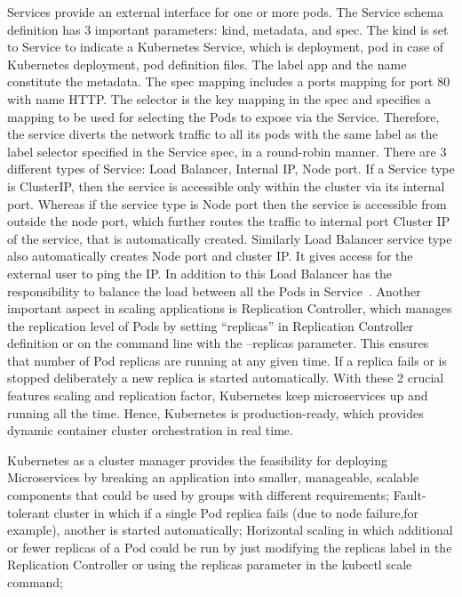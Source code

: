 Services provide an external interface for one or more pods. The
Service schema definition has 3 important parameters: kind, metadata,
and spec. The kind is set to Service to indicate a Kubernetes Service,
which is deployment, pod in case of Kubernetes deployment, pod
definition files. The label app and the name constitute the
metadata. The spec mapping includes a ports mapping for port 80 with
name HTTP. The selector is the key mapping in the spec and specifies a
mapping to be used for selecting the Pods to expose via the
Service. Therefore, the service diverts the network traffic to all its
pods with the same label as the label selector specified in the
Service spec, in a round-robin manner. There are 3 different types
of Service: Load Balancer, Internal IP, Node port. If a Service type
is ClusterIP, then the service is accessible only within the cluster
via its internal port. Whereas if the service type is Node port then
the service is accessible from outside the node port, which further
routes the traffic to internal port Cluster IP of the service, that is
automatically created. Similarly Load Balancer service type also
automatically creates Node port and cluster IP. It gives access for
the external user to ping the IP. In addition to this Load Balancer
has the responsibility to balance the load between all the Pods in
Service~\cite{hid-sp18-602-services}. Another important aspect in
scaling applications is Replication Controller, which manages the
replication level of Pods by setting “replicas” in Replication
Controller definition or on the command line with the –replicas
parameter. This ensures that number of Pod replicas are running at any
given time. If a replica fails or is stopped deliberately a new
replica is started automatically. With these 2 crucial features
scaling and replication factor, Kubernetes keep microservices up and
running all the time. Hence, Kubernetes is production-ready, which
provides dynamic container cluster orchestration in real time.

Kubernetes as a cluster manager provides the feasibility for deploying
Microservices by breaking an application into smaller, manageable,
scalable components that could be used by groups with different
requirements; Fault-tolerant cluster in which if a single Pod replica
fails (due to node failure,for example), another is started
automatically; Horizontal scaling in which additional or fewer
replicas of a Pod could be run by just modifying the replicas label in
the Replication Controller or using the replicas parameter in the
kubectl scale command;


